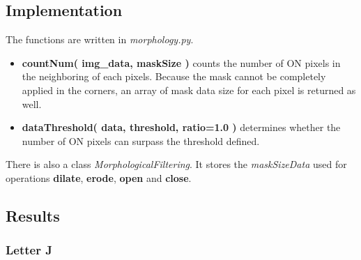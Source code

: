 \documentclass[paper=a4, fontsize=11pt]{scrartcl}
\numberwithin{equation}{section}		%
\numberwithin{figure}{section}			%
\numberwithin{table}{section}				%
\begin{document}
\subsection{Implementation}

The functions are written in \emph{morphology.py}.

\begin{itemize}
\item \textbf{ countNum( img\_data, maskSize ) } counts the number of ON pixels in the neighboring of each pixels. 
Because the mask cannot be completely applied in the corners, an array of mask data size for each pixel is returned as well.
\item \textbf{ dataThreshold( data, threshold, ratio=1.0 ) } determines whether the number of ON pixels can surpass the threshold defined.
\end{itemize}

There is also a class \emph{MorphologicalFiltering}.
It stores the \emph{maskSizeData} used for operations \textbf{dilate}, \textbf{erode}, \textbf{open} and \textbf{close}.

\subsection{Results}

\subsubsection{Letter J}
\end{document}
